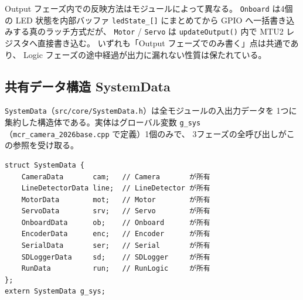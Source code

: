 \documentclass[a4paper,11pt,dvipdfmx]{jsarticle}
\begin{document}
\begin{cautionbox}[全モジュールがラッチ方式ではない]
Output フェーズ内での反映方法はモジュールによって異なる。
\texttt{Onboard} は4個の LED 状態を内部バッファ \texttt{ledState\_[]} にまとめてから
GPIO へ一括書き込みする真のラッチ方式だが、
\texttt{Motor} / \texttt{Servo} は \texttt{updateOutput()} 内で MTU2 レジスタへ直接書き込む。
いずれも「Output フェーズでのみ書く」点は共通であり、
Logic フェーズの途中経過が出力に漏れない性質は保たれている。
\end{cautionbox}

\subsection{共有データ構造 SystemData}\label{sec:systemdata}

\texttt{SystemData}（\texttt{src/core/SystemData.h}）は全モジュールの入出力データを
1つに集約した構造体である。実体はグローバル変数 \texttt{g\_sys}
（\texttt{mcr\_camera\_2026base.cpp} で定義）1個のみで、
3フェーズの全呼び出しがこの参照を受け取る。

\begin{lstlisting}[caption={SystemData の定義},label=lst:systemdata]
struct SystemData {
    CameraData       cam;   // Camera       が所有
    LineDetectorData line;  // LineDetector が所有
    MotorData        mot;   // Motor        が所有
    ServoData        srv;   // Servo        が所有
    OnboardData      ob;    // Onboard      が所有
    EncoderData      enc;   // Encoder      が所有
    SerialData       ser;   // Serial       が所有
    SDLoggerData     sd;    // SDLogger     が所有
    RunData          run;   // RunLogic     が所有
};
extern SystemData g_sys;
\end{lstlisting}
\end{document}
